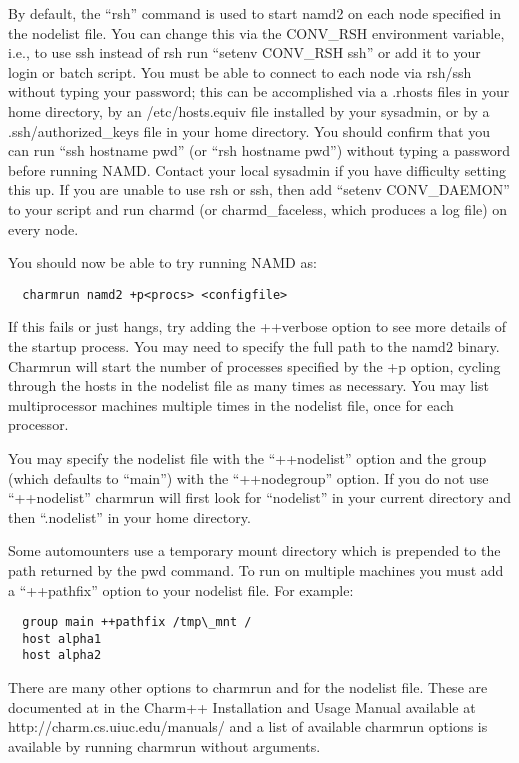 By default, the ``rsh'' command is used to start namd2
on each node specified in the nodelist file.  You can change this via
the CONV\_RSH environment variable, i.e., to use ssh instead of rsh run
``setenv CONV\_RSH ssh'' or add it to your login or batch script.  You
must be able to connect to each node via rsh/ssh without typing your
password; this can be accomplished via a .rhosts files in your home
directory, by an /etc/hosts.equiv file installed by your sysadmin, or
by a .ssh/authorized\_keys file in your home directory.  You should
confirm that you can run ``ssh hostname pwd'' (or ``rsh hostname pwd'')
without typing a password before running NAMD.  Contact your local
sysadmin if you have difficulty setting this up.  If you are unable to
use rsh or ssh, then add ``setenv CONV\_DAEMON'' to your script and run 
charmd (or charmd\_faceless, which produces a log file) on every node.

You should now be able to try running NAMD as:

\begin{verbatim}
  charmrun namd2 +p<procs> <configfile>
\end{verbatim}

If this fails or just hangs, try adding the ++verbose option to see
more details of the startup process.  You may need to specify the full
path to the namd2 binary.  Charmrun will start the number of processes
specified by the +p option, cycling through the hosts in the nodelist
file as many times as necessary.  You may list multiprocessor machines
multiple times in the nodelist file, once for each processor.

You may specify the nodelist file with the ``++nodelist'' option and the
group (which defaults to ``main'') with the ``++nodegroup'' option.  If
you do not use ``++nodelist'' charmrun will first look for ``nodelist''
in your current directory and then ``.nodelist'' in your home directory.

Some automounters use a temporary mount directory which is prepended
to the path returned by the pwd command.  To run on multiple machines
you must add a ``++pathfix'' option to your nodelist file.  For example:

\begin{verbatim}
  group main ++pathfix /tmp\_mnt /
  host alpha1
  host alpha2
\end{verbatim}

There are many other options to charmrun and for the nodelist file.
These are documented at in the Charm++ Installation and Usage Manual
available at http://charm.cs.uiuc.edu/manuals/ and a list of available
charmrun options is available by running charmrun without arguments.

